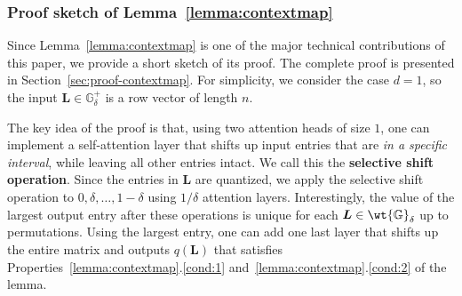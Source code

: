 \documentclass{article} %
\def\mL{{\bm{L}}}
\def\sG{{\mathbb{G}}}
\begin{document}
\vspace*{-3pt}
\subsubsection{Proof sketch of Lemma~\ref{lemma:contextmap}}
\vspace*{-3pt}
Since Lemma~\ref{lemma:contextmap} is one of the major technical contributions of this paper, we provide a short sketch of its proof. The complete proof is presented in Section~\ref{sec:proof-contextmap}.
For simplicity, we consider the case $d = 1$, so the input $\mL \in \sG^+_{\delta}$ is a row vector of length $n$. 

The key idea of the proof is that, using two attention heads of size $1$, one can implement a self-attention layer that shifts up input entries that are \emph{in a specific interval}, while leaving all other entries intact. We call this the \textbf{selective shift operation}. Since the entries in $\mL$ are quantized, we apply the selective shift operation to $0, \delta, \dots, 1-\delta$ using $1/\delta$ attention layers. Interestingly, the value of the largest output entry after these operations is unique for each $\mL \in \wt {\sG}_{\delta}$ up to permutations. Using the largest entry, one can add one last layer that shifts up the entire matrix and outputs $q(\mL)$ that satisfies Properties~\ref{lemma:contextmap}.\ref{cond:1} and~\ref{lemma:contextmap}.\ref{cond:2} of the lemma.
\end{document}
